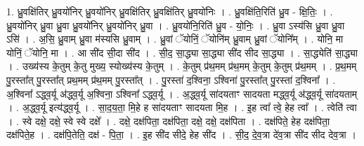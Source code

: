 \documentclass[17pt]{extarticle}
\begin{document}
1. ध्रु॒वक्षि॑तिर् ध्रु॒वयो॑निर् ध्रु॒वयो॑निर् ध्रु॒वक्षि॑तिर् ध्रु॒वक्षि॑तिर् ध्रु॒वयो॑निः । . ध्रु॒वक्षि॑ति॒रिति॑ ध्रु॒व - क्षि॒तिः॒ । . ध्रु॒वयो॑निर् ध्रु॒वा ध्रु॒वा ध्रु॒वयो॑निर् ध्रु॒वयो॑निर् ध्रु॒वा । . ध्रु॒वयो॑नि॒रिति॑ ध्रु॒व - यो॒निः॒ । . ध्रु॒वा ऽस्य॑सि ध्रु॒वा ध्रु॒वा ऽसि॑ । . अ॒सि॒ ध्रु॒वाम् ध्रु॒वा म॑स्यसि ध्रु॒वाम् । . ध्रु॒वां ॅयोनिं॒ ॅयोनि॑म् ध्रु॒वाम् ध्रु॒वां ॅयोनि᳚म् । . योनि॒ मा योनिं॒ ॅयोनि॒ मा । . आ सी॑द सी॒दा सी॑द । . सी॒द॒ सा॒द्ध्या सा॒द्ध्या सी॑द सीद सा॒द्ध्या । . सा॒द्ध्येति॑ सा॒द्ध्या । . उख्य॑स्य के॒तुम् के॒तु मुख्य॒ स्योख्य॑स्य के॒तुम् । . के॒तुम् प्र॑थ॒मम् प्र॑थ॒मम् के॒तुम् के॒तुम् प्र॑थ॒मम् । . प्र॒थ॒मम् पु॒रस्ता᳚त् पु॒रस्ता᳚त् प्रथ॒मम् प्र॑थ॒मम् पु॒रस्ता᳚त् । . पु॒रस्ता॑ द॒श्विना॒ ऽश्विना॑ पु॒रस्ता᳚त् पु॒रस्ता॑ द॒श्विना᳚ । . अ॒श्विना᳚ ऽद्ध्व॒र्यू अ॑द्ध्व॒र्यू अ॒श्विना॒ ऽश्विना᳚ ऽद्ध्व॒र्यू । . अ॒द्ध्व॒र्यू सा॑दयताꣳ सादयता मद्ध्व॒र्यू अ॑द्ध्व॒र्यू सा॑दयताम् । . अ॒द्ध्व॒र्यू इत्य॑द्ध्व॒र्यू । . सा॒द॒य॒ता॒ मि॒हे ह सा॑दयताꣳ सादयता मि॒ह । . इ॒ह त्वा᳚ त्वे॒ हेह त्वा᳚ । . त्वेति॑ त्वा । . स्वे दक्षे॒ दक्षे॒ स्वे स्वे दक्षे᳚ । . दक्षे॒ दक्ष॑पिता॒ दक्ष॑पिता॒ दक्षे॒ दक्षे॒ दक्ष॑पिता । . दक्ष॑पिते॒ हेह दक्ष॑पिता॒ दक्ष॑पिते॒ह । . दक्ष॑पि॒तेति॒ दक्ष॑ - पि॒ता॒ । . इ॒ह सी॑द सीदे॒ हेह सी॑द । . सी॒द॒ दे॒व॒त्रा दे॑व॒त्रा सी॑द सीद देव॒त्रा । \newline
\end{document}
